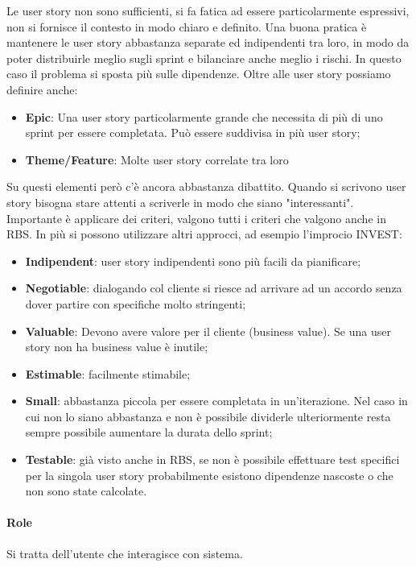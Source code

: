 \noindent Le user story non sono sufficienti, si fa fatica ad essere particolarmente espressivi, non si fornisce il contesto in modo chiaro e definito.
Una buona pratica è mantenere le user story abbastanza separate ed indipendenti tra loro, in modo da poter distribuirle meglio sugli sprint e bilanciare anche meglio i rischi. In questo caso il problema si sposta più sulle dipendenze.
Oltre alle user story possiamo definire anche:
\begin{itemize}
	\item \textbf{Epic}: Una user story particolarmente grande che necessita di più di uno sprint per essere completata. Può essere suddivisa in più user story;
	\item \textbf{Theme/Feature}: Molte user story correlate tra loro
\end{itemize}
Su questi elementi però c'è ancora abbastanza dibattito.
Quando si scrivono user story bisogna stare attenti a scriverle in modo che siano "interessanti". Importante è applicare dei criteri, valgono tutti i criteri che valgono anche in RBS. In più si possono utilizzare altri approcci, ad esempio l'improcio INVEST:
\begin{itemize}
	\item \textbf{Indipendent}: user story indipendenti sono più facili da pianificare;
	\item \textbf{Negotiable}: dialogando col cliente si riesce ad arrivare ad un accordo senza dover partire con specifiche molto stringenti;
	\item \textbf{Valuable}: Devono avere valore per il cliente (business value). Se una user story non ha business value è inutile;
	\item \textbf{Estimable}: facilmente stimabile;
	\item \textbf{Small}: abbastanza piccola per essere completata in un'iterazione. Nel caso in cui non lo siano abbastanza e non è possibile dividerle ulteriormente resta sempre possibile aumentare la durata dello sprint;
	\item \textbf{Testable}: già visto anche in RBS, se non è possibile effettuare test specifici per la singola user story probabilmente esistono dipendenze nascoste o che non sono state calcolate.
\end{itemize}
\paragraph{Role}
Si tratta dell'utente che interagisce con sistema.

